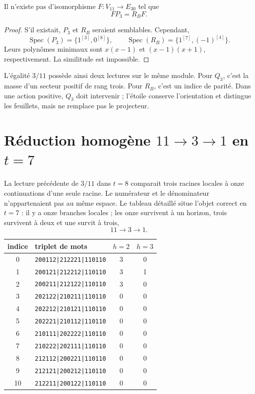 \begin{theorem}
\label{thm:no-go-proyector-estrella}
Il n'existe pas d'isomorphisme \(F:V_{11}\to E_{30}\) tel que
\[
 FP_3=R_BF.
\]
\end{theorem}

\begin{proof}
S'il existait, \(P_3\) et \(R_B\) seraient semblables. Cependant,
\[
 \operatorname{Spec}(P_3)=\{1^{[3]},0^{[8]}\},
 \qquad
 \operatorname{Spec}(R_B)=\{1^{[7]},(-1)^{[4]}\}.
\]
Leurs polynômes minimaux sont \(x(x-1)\) et
\((x-1)(x+1)\), respectivement. La similitude est impossible.
\end{proof}

L'égalité \(3/11\) possède ainsi deux lectures sur le même module. Pour
\(Q_3\), c'est la masse d'un secteur positif de rang trois. Pour \(R_B\), c'est
un indice de parité. Dans une action positive, \(Q_3\) doit intervenir ;
l'étoile conserve l'orientation et distingue les feuillets, mais ne remplace pas le
projecteur.

\section{Réduction homogène \texorpdfstring{\(11\to3\to1\)}{11-3-1} en \texorpdfstring{\(t=7\)}{t=7}}

La lecture précédente de \(3/11\) dans \(t=8\) comparait trois racines locales
à onze continuations d'une seule racine. Le numérateur et le dénominateur
n'appartenaient pas au même espace. Le tableau détaillé situe l'objet correct
en \(t=7\) : il y a onze branches locales ; les onze survivent à un horizon, trois
survivent à deux et une survit à trois,
\[
 \boxed{11\longrightarrow3\longrightarrow1.}
\]

\begin{center}
\small
\begin{tabularx}{\textwidth}{cYcc}
\toprule
indice&triplet de mots&\(h=2\)&\(h=3\)\\
&\texttt{200112|212221|110110}&3&0\\
1&\texttt{200121|212212|110110}&3&1\\
2&\texttt{200211|212122|110110}&3&0\\
3&\texttt{202122|210211|110110}&0&0\\
4&\texttt{202212|210121|110110}&0&0\\
5&\texttt{202221|210112|110110}&0&0\\
6&\texttt{210111|202222|110110}&0&0\\
7&\texttt{210222|202111|110110}&0&0\\
8&\texttt{212112|200221|110110}&0&0\\
9&\texttt{212121|200212|110110}&0&0\\
10&\texttt{212211|200122|110110}&0&0\\
\bottomrule
\end{tabularx}
\end{center}


